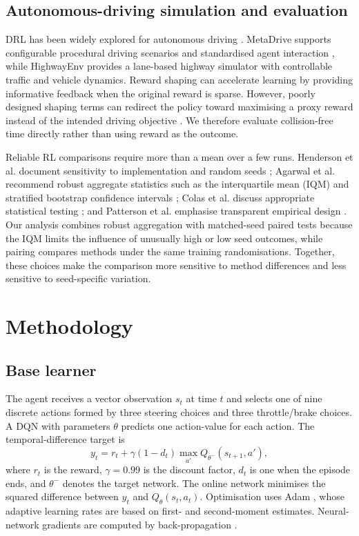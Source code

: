 \documentclass[runningheads]{llncs}
\begin{document}
\subsection{Autonomous-driving simulation and evaluation}

DRL has been widely explored for autonomous driving \cite{kiran2022survey,sallab2017drl,kendall2019driving}. MetaDrive supports configurable procedural driving scenarios and standardised agent interaction \cite{li2023metadrive}, while HighwayEnv provides a lane-based highway simulator with controllable traffic and vehicle dynamics. Reward shaping can accelerate learning by providing informative feedback when the original reward is sparse. However, poorly designed shaping terms can redirect the policy toward maximising a proxy reward instead of the intended driving objective \cite{ng1999shaping}. We therefore evaluate collision-free time directly rather than using reward as the outcome.

Reliable RL comparisons require more than a mean over a few runs. Henderson et al. document sensitivity to implementation and random seeds \cite{henderson2018matters}; Agarwal et al. recommend robust aggregate statistics such as the interquartile mean (IQM) and stratified bootstrap confidence intervals \cite{agarwal2021precipice}; Colas et al. discuss appropriate statistical testing \cite{colas2019empirical}; and Patterson et al. emphasise transparent empirical design \cite{patterson2024empirical}. Our analysis combines robust aggregation with matched-seed paired tests because the IQM limits the influence of unusually high or low seed outcomes, while pairing compares methods under the same training randomisations. Together, these choices make the comparison more sensitive to method differences and less sensitive to seed-specific variation.

\section{Methodology}

\subsection{Base learner}

The agent receives a vector observation $s_t$ at time $t$ and selects one of nine discrete actions formed by three steering choices and three throttle/brake choices. A DQN with parameters $\theta$ predicts one action-value for each action. The temporal-difference target is
\begin{equation}
y_t=r_t+\gamma(1-d_t)\max_{a'}Q_{\theta^-}(s_{t+1},a'),
\end{equation}
where $r_t$ is the reward, $\gamma=0.99$ is the discount factor, $d_t$ is one when the episode ends, and $\theta^-$ denotes the target network. The online network minimises the squared difference between $y_t$ and $Q_\theta(s_t,a_t)$. Optimisation uses Adam \cite{kingma2015adam}, whose adaptive learning rates are based on first- and second-moment estimates. Neural-network gradients are computed by back-propagation \cite{rumelhart1986backprop}.
\end{document}
